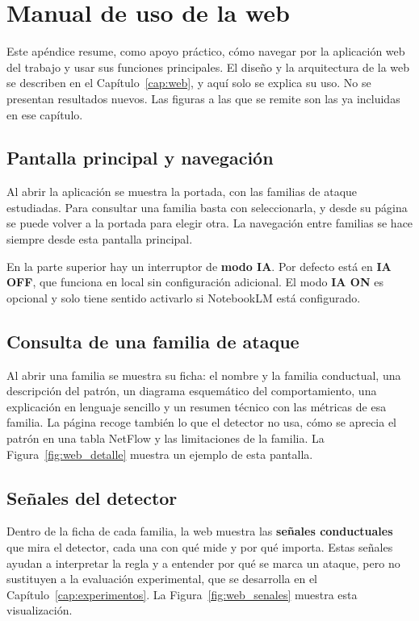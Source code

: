 \chapter{Manual de uso de la web}
\label{ap:manual_web}

Este apéndice resume, como apoyo práctico, cómo navegar por la aplicación web del trabajo y usar sus funciones principales. El diseño y la arquitectura de la web se describen en el Capítulo~\ref{cap:web}, y aquí solo se explica su uso. No se presentan resultados nuevos. Las figuras a las que se remite son las ya incluidas en ese capítulo.

\section{Pantalla principal y navegación}
\label{sec:apa_navegacion}

Al abrir la aplicación se muestra la portada, con las familias de ataque estudiadas. Para consultar una familia basta con seleccionarla, y desde su página se puede volver a la portada para elegir otra. La navegación entre familias se hace siempre desde esta pantalla principal.

En la parte superior hay un interruptor de \textbf{modo IA}. Por defecto está en \textbf{IA OFF}, que funciona en local sin configuración adicional. El modo \textbf{IA ON} es opcional y solo tiene sentido activarlo si NotebookLM está configurado.

\section{Consulta de una familia de ataque}
\label{sec:apa_familia}

Al abrir una familia se muestra su ficha: el nombre y la familia conductual, una descripción del patrón, un diagrama esquemático del comportamiento, una explicación en lenguaje sencillo y un resumen técnico con las métricas de esa familia. La página recoge también lo que el detector no usa, cómo se aprecia el patrón en una tabla NetFlow y las limitaciones de la familia. La Figura~\ref{fig:web_detalle} muestra un ejemplo de esta pantalla.

\section{Señales del detector}
\label{sec:apa_senales}

Dentro de la ficha de cada familia, la web muestra las \textbf{señales conductuales} que mira el detector, cada una con qué mide y por qué importa. Estas señales ayudan a interpretar la regla y a entender por qué se marca un ataque, pero no sustituyen a la evaluación experimental, que se desarrolla en el Capítulo~\ref{cap:experimentos}. La Figura~\ref{fig:web_senales} muestra esta visualización.

